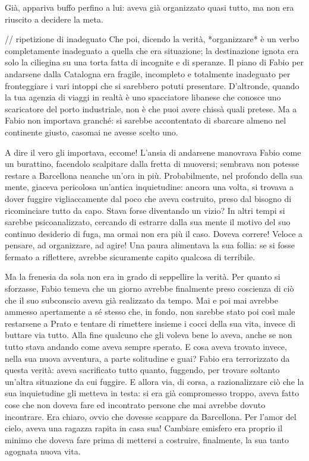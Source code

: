 Già, appariva buffo perfino a lui: aveva già organizzato quasi tutto, ma non era riuscito a decidere la meta.

// ripetizione di inadeguato
Che poi, dicendo la verità, *organizzare* è un verbo completamente inadeguato a quella che era situazione; la destinazione ignota era solo la ciliegina su una torta fatta di incognite e di speranze. Il piano di Fabio per andarsene dalla Catalogna era fragile, incompleto e totalmente inadeguato per fronteggiare i vari intoppi che si sarebbero potuti presentare. D'altronde, quando la tua agenzia di viaggi in realtà è uno spacciatore libanese che conosce uno scaricatore del porto industriale, non è che puoi avere chissà quali pretese. Ma a Fabio non importava granché: si sarebbe accontentato di sbarcare almeno nel continente giusto, casomai ne avesse scelto uno.

A dire il vero gli importava, eccome! L'ansia di andarsene manovrava Fabio come un burattino, facendolo scalpitare dalla fretta di muoversi; sembrava non potesse restare a Barcellona neanche un'ora in più. Probabilmente, nel profondo della sua mente, giaceva pericolosa un'antica inquietudine: ancora una volta, si trovava a dover fuggire vigliaccamente dal poco che aveva costruito, preso dal bisogno di ricominciare tutto da capo. Stava forse diventando un vizio? In altri tempi si sarebbe psicoanalizzato, cercando di estrarre dalla sua mente il motivo del suo continuo desiderio di fuga, ma ormai non era più il caso. Doveva correre! Veloce a pensare, ad organizzare, ad agire! Una paura alimentava la sua follia: se si fosse fermato a riflettere, avrebbe sicuramente capito qualcosa di terribile.

Ma la frenesia da sola non era in grado di seppellire la verità. Per quanto si sforzasse, Fabio temeva che un giorno avrebbe finalmente preso coscienza di ciò che il suo subconscio aveva già realizzato da tempo. Mai e poi mai avrebbe ammesso apertamente a sé stesso che, in fondo, non sarebbe stato poi così male restarsene a Prato e tentare di rimettere insieme i cocci della sua vita, invece di buttare via tutto. Alla fine qualcuno che gli voleva bene lo aveva, anche se non tutto stava andando come aveva sempre sperato. E cosa aveva trovato invece, nella sua nuova avventura, a parte solitudine e guai? Fabio era terrorizzato da questa verità: aveva sacrificato tutto quanto, fuggendo, per trovare soltanto un'altra situazione da cui fuggire. E allora via, di corsa, a razionalizzare ciò che la sua inquietudine gli metteva in testa: si era già compromesso troppo, aveva fatto cose che non doveva fare ed incontrato persone che mai avrebbe dovuto incontrare. Era chiaro, ovvio che dovesse scappare da Barcellona. Per l'amor del cielo, aveva una ragazza rapita in casa sua! Cambiare emisfero era proprio il minimo che doveva fare prima di mettersi a costruire, finalmente, la sua tanto agognata nuova vita.

